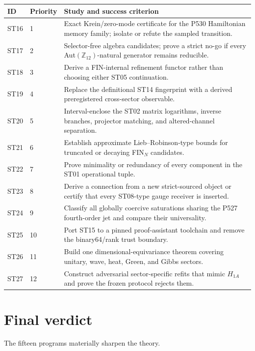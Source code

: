 \documentclass[11pt,a4paper]{article}
\begin{document}
\begin{longtable}{@{}p{}p{}p{}@{}}
\toprule
ID & Priority & Study and success criterion\\
\midrule
ST16 & 1 & Exact Krein/zero-mode certificate for the P530 Hamiltonian memory family; isolate or refute the sampled transition.\\
ST17 & 2 & Selector-free algebra candidates; prove a strict no-go if every Aut$(\mathbb Z_{12})$-natural generator remains reducible.\\
ST18 & 3 & Derive a FIN-internal refinement functor rather than choosing either ST05 continuation.\\
ST19 & 4 & Replace the definitional ST14 fingerprint with a derived preregistered cross-sector observable.\\
ST20 & 5 & Interval-enclose the ST02 matrix logarithms, inverse branches, projector matching, and altered-channel separation.\\
ST21 & 6 & Establish approximate Lieb--Robinson-type bounds for truncated or decaying FIN$_N$ candidates.\\
ST22 & 7 & Prove minimality or redundancy of every component in the ST01 operational tuple.\\
ST23 & 8 & Derive a connection from a new strict-sourced object or certify that every ST08-type gauge receiver is inserted.\\
ST24 & 9 & Classify all globally coercive saturations sharing the P527 fourth-order jet and compare their universality.\\
ST25 & 10 & Port ST15 to a pinned proof-assistant toolchain and remove the binary64/rank trust boundary.\\
ST26 & 11 & Build one dimensional-equivariance theorem covering unitary, wave, heat, Green, and Gibbs sectors.\\
ST27 & 12 & Construct adversarial sector-specific refits that mimic $H_{1A}$ and prove the frozen protocol rejects them.\\
\bottomrule
\end{longtable}

\section{Final verdict}

The fifteen programs materially sharpen the theory.
\end{document}
